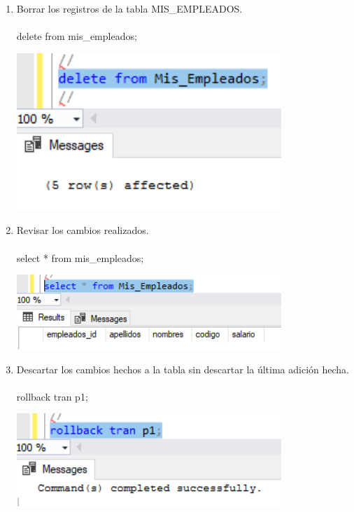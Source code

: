 \begin{enumerate}[1.]
	\item Borrar los registros de la tabla MIS\_EMPLEADOS.
          \\
	\\delete from mis\_empleados;
	\begin{center}
	\includegraphics[width=10cm]{./Imagenes/19} 
	\end{center}

	\item Revisar los cambios realizados.
          \\
	\\select * from mis\_empleados;
	\begin{center}
	\includegraphics[width=10cm]{./Imagenes/20} 
	\end{center}

	\item Descartar los cambios hechos a la tabla sin descartar la última adición hecha.
          \\
	\\rollback tran p1;
	\begin{center}
	\includegraphics[width=10cm]{./Imagenes/21} 
	\end{center}


\end{enumerate}
